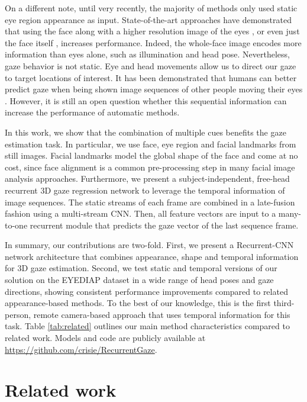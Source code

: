 \documentclass{bmvc2k}
\begin{document}
On a different note, until very recently, the majority of methods only used static eye region appearance as input. State-of-the-art approaches have demonstrated that using the face along with a higher resolution image of the eyes \cite{krafka2016eye}, or even just the face itself \cite{zhang2017s}, increases performance. Indeed, the whole-face image encodes more information than eyes alone, such as illumination and head pose. Nevertheless, gaze behavior is not static. Eye and head movements allow us to direct our gaze to target locations of interest. It has been demonstrated that humans can better predict gaze when being shown image sequences of other people moving their eyes \cite{anderson2016motion}. However, it is still an open question whether this sequential information can increase the performance of automatic methods. 

In this work, we show that the combination of multiple cues benefits the gaze estimation task. In particular, we use face, eye region and facial landmarks from still images. Facial landmarks model the global shape of the face and come at no cost, since face alignment is a common pre-processing step in many facial image analysis approaches. Furthermore, we present a subject-independent, free-head recurrent 3D gaze regression network to leverage the temporal information of image sequences. The static streams of each frame are combined in a late-fusion fashion using a multi-stream CNN. Then, all feature vectors are input to a many-to-one recurrent module that predicts the gaze vector of the last sequence frame. 	

In summary, our contributions are two-fold. First, we present a Recurrent-CNN network architecture that combines appearance, shape and temporal information for 3D gaze estimation. Second, we test static and temporal versions of our solution on the EYEDIAP dataset \cite{FunesMora_ETRA_2014} in a wide range of head poses and gaze directions, showing consistent performance improvements compared to related appearance-based methods. To the best of our knowledge, this is the first third-person, remote camera-based approach that uses temporal information for this task. Table \ref{tab:related} outlines our main method characteristics compared to related work. Models and code are publicly available at \url{https://github.com/crisie/RecurrentGaze}.

\section{Related work}
\label{sec:related}
\end{document}
